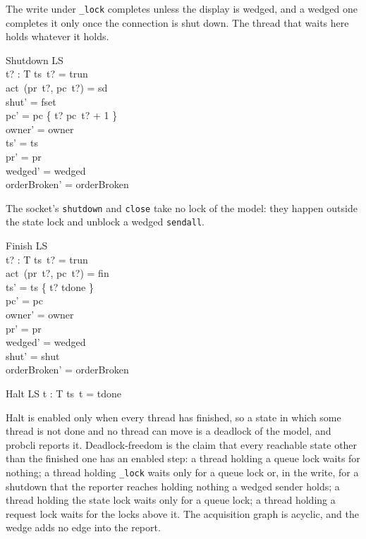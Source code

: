 \documentclass[a4paper,10pt,fleqn]{article}
\begin{document}
The write under \texttt{\_lock} completes unless the display is wedged, and
a wedged one completes it only once the connection is shut down.  The thread
that waits here holds whatever it holds.

\begin{schema}{Shutdown}
  \Delta LS \\
  t? : T
\where
  ts~t? = trun \\
  act~(pr~t?, pc~t?) = sd \\
  shut' = fset \\
  pc' = pc \oplus \{ t? \mapsto pc~t? + 1 \} \\
  owner' = owner \\
  ts' = ts \\
  pr' = pr \\
  wedged' = wedged \\
  orderBroken' = orderBroken
\end{schema}

The socket's \texttt{shutdown} and \texttt{close} take no lock of the model:
they happen outside the state lock and unblock a wedged \texttt{sendall}.

\begin{schema}{Finish}
  \Delta LS \\
  t? : T
\where
  ts~t? = trun \\
  act~(pr~t?, pc~t?) = fin \\
  ts' = ts \oplus \{ t? \mapsto tdone \} \\
  pc' = pc \\
  owner' = owner \\
  pr' = pr \\
  wedged' = wedged \\
  shut' = shut \\
  orderBroken' = orderBroken
\end{schema}

\begin{schema}{Halt}
  \Xi LS
\where
  \forall t : T \spot ts~t = tdone
\end{schema}

Halt is enabled only when every thread has finished, so a state in which some
thread is not done and no thread can move is a deadlock of the model, and
probcli reports it.  Deadlock-freedom is the claim that every reachable state
other than the finished one has an enabled step: a thread holding a queue
lock waits for nothing; a thread holding \texttt{\_lock} waits only for a
queue lock or, in the write, for a shutdown that the reporter reaches holding
nothing a wedged sender holds; a thread holding the state lock waits only for
a queue lock; a thread holding a request lock waits for the locks above it.
The acquisition graph is acyclic, and the wedge adds no edge into the report.
\end{document}
